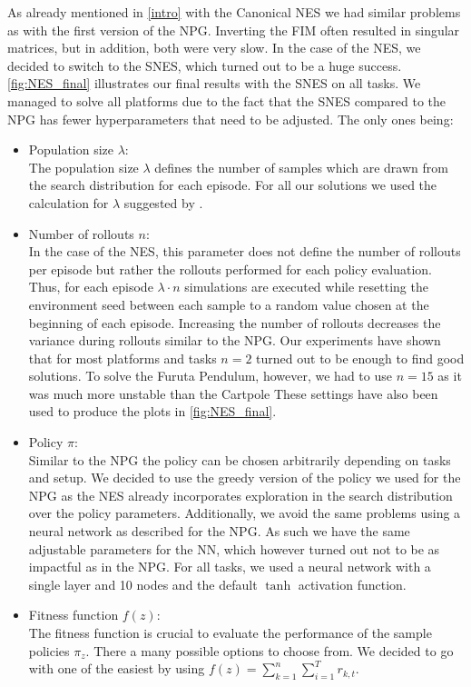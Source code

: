 As already mentioned in \autoref{intro} with the Canonical NES we had similar problems as with the first version of the NPG. Inverting the FIM often resulted in singular matrices, but in addition, both were very slow. In the case of the NES, we decided to switch to the SNES, which turned out to be a huge success. \autoref{fig:NES_final} illustrates our final results with the SNES on all tasks. We managed to solve all platforms due to the fact that the SNES compared to the NPG has fewer hyperparameters that need to be adjusted. The only ones being:
\begin{itemize}
  \item Population size $\lambda$: \\
  The population size $\lambda$ defines the number of samples which are drawn from the search distribution for each episode. For all our solutions we used the calculation for $\lambda$ suggested by \cite{Wierstra14}.\smallskip
  \item Number of rollouts $n$: \\
  In the case of the NES, this parameter does not define the number of rollouts per episode but rather the rollouts performed for each policy evaluation. Thus, for each episode $\lambda \cdot n$ simulations are executed while resetting the environment seed between each sample to a random value chosen at the beginning of each episode. Increasing the number of rollouts decreases the variance during rollouts similar to the NPG. Our experiments have shown that for most platforms and tasks $n=2$ turned out to be enough to find good solutions. To solve the Furuta Pendulum, however, we had to use $n=15$ as it was much more unstable than the Cartpole These settings have also been used to produce the plots in \autoref{fig:NES_final}.\smallskip
  \item Policy $\pi$: \\
  Similar to the NPG the policy can be chosen arbitrarily depending on tasks and setup. We decided to use the greedy version of the policy we used for the NPG as the NES already incorporates exploration in the search distribution over the policy parameters. Additionally, we avoid the same problems using a neural network as described for the NPG. As such we have the same adjustable parameters for the NN, which however turned out not to be as impactful as in the NPG. For all tasks, we used a neural network with a single layer and 10 nodes and the default $\tanh$ activation function.\smallskip
  \item Fitness function $f(z)$: \\
  The fitness function is crucial to evaluate the performance of the sample policies $\pi_z$. There a many possible options to choose from. We decided to go with one of the easiest by using $f(z) = \sum_{k=1}^{n} \sum_{i=1}^{T} r_{k,t}$.
\end{itemize}

